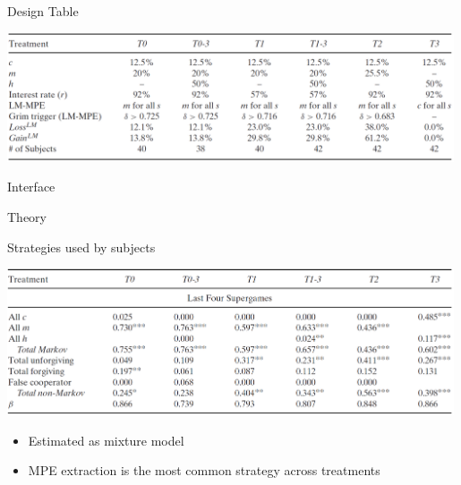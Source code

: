 \documentclass{beamer}
\begin{document}
\begin{frame}{Design Table}
\begin{card}
    \begin{center}
        \includegraphics[width=0.99\textwidth]{./i/Vtbl1.png}
    \end{center}
\end{card}
\end{frame}

\begin{frame}{Interface}
\centering {}
\end{frame}

\begin{frame}{Theory}
\centering {}
\end{frame}

\begin{frame}{Strategies used by subjects}
\begin{card}
    \begin{center}
        \includegraphics[width=0.99\textwidth]{./i/Vtbl5a.png}
    \end{center}
\end{card}

\begin{card}
    \begin{itemize}
    	\item Estimated as mixture model
    	\item MPE extraction is the most common strategy across treatments
    \end{itemize}
\end{card}
\end{frame}
\end{document}
